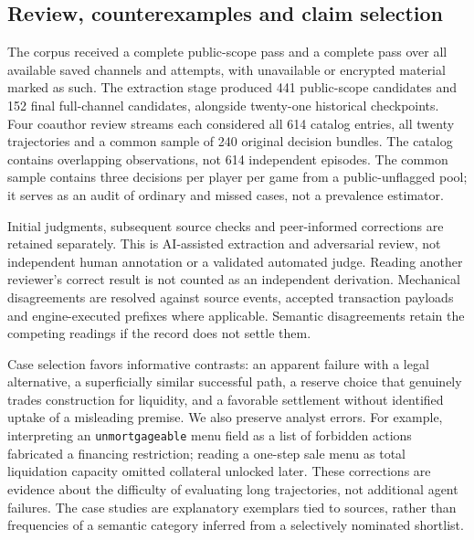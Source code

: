 \subsection{Review, counterexamples and claim selection}
\label{sec:review}

The corpus received a complete public-scope pass and a complete pass over all available saved channels and attempts, with unavailable or encrypted material marked as such. The extraction stage produced 441 public-scope candidates and 152 final full-channel candidates, alongside twenty-one historical checkpoints. Four coauthor review streams each considered all 614 catalog entries, all twenty trajectories and a common sample of 240 original decision bundles. The catalog contains overlapping observations, not 614 independent episodes. The common sample contains three decisions per player per game from a public-unflagged pool; it serves as an audit of ordinary and missed cases, not a prevalence estimator.

Initial judgments, subsequent source checks and peer-informed corrections are retained separately. This is AI-assisted extraction and adversarial review, not independent human annotation or a validated automated judge. Reading another reviewer's correct result is not counted as an independent derivation. Mechanical disagreements are resolved against source events, accepted transaction payloads and engine-executed prefixes where applicable. Semantic disagreements retain the competing readings if the record does not settle them.

Case selection favors informative contrasts: an apparent failure with a legal alternative, a superficially similar successful path, a reserve choice that genuinely trades construction for liquidity, and a favorable settlement without identified uptake of a misleading premise. We also preserve analyst errors. For example, interpreting an \texttt{unmortgageable} menu field as a list of forbidden actions fabricated a financing restriction; reading a one-step sale menu as total liquidation capacity omitted collateral unlocked later. These corrections are evidence about the difficulty of evaluating long trajectories, not additional agent failures. The case studies are explanatory exemplars tied to sources, rather than frequencies of a semantic category inferred from a selectively nominated shortlist.

